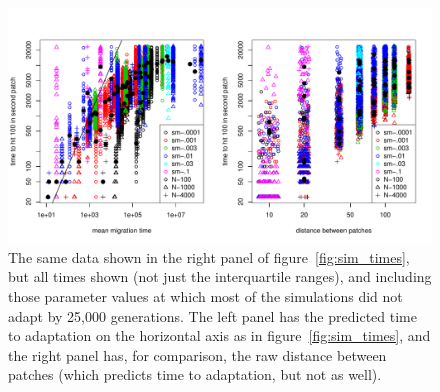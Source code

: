 \documentclass{article}
\begin{document}
\begin{figure}
  \begin{center}
    \includegraphics{migration-time-predicted}
  \end{center}
  \caption{
    The same data shown in the right panel of figure~\ref{fig:sim_times},
    but all times shown (not just the interquartile ranges),
    and including those parameter values at which most of the simulations did not adapt by 25,000 generations.
    The left panel has the predicted time to adaptation on the horizontal axis as in figure~\ref{fig:sim_times},
    and the right panel has, for comparison, the raw distance between patches 
    (which predicts time to adaptation, but not as well).
  } \label{sfig:sim_mutation_times}
\end{figure}

\end{document}
